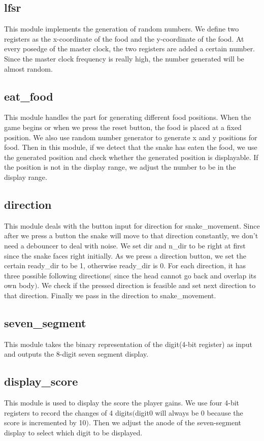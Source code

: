 \documentclass[12pt]{article}
\begin{document}
\subsection*{lfsr}
This module implements the generation of random numbers. We define two registers as the x-coordinate of the food and the y-coordinate of the food. At every posedge of the master clock, the two registers are added a certain number. Since the master clock frequency is really high, the number generated will be almost random.  

\subsection*{eat\_food}
This module handles the part for generating different food positions. When the game begins or when we press the reset button, the food is placed at a fixed position. We also use random number generator to generate x and y positions for food. Then in this module, if we detect that the snake has eaten the food, we use the generated position and check whether the generated position is displayable. If the position is not in the display range, we adjust the number to be in the display range.

\subsection*{direction}
This module deals with the button input for direction for snake\_movement. Since after we press a button the snake will move to that direction constantly, we don't need a debouncer to deal with noise. We set dir and n\_dir to be right at first since the snake faces right initially. As we press a direction button, we set the certain ready\_dir to be 1, otherwise ready\_dir is 0. For each direction, it has three possible following directions$($ since the head cannot go back and overlap its own body$)$. We check if the pressed direction is feasible and set next direction to that direction. Finally we pass in the direction to snake\_movement.

\subsection*{seven\_segment}
This module takes the binary representation of the digit(4-bit register) as input and outputs the 8-digit seven segment display.



\subsection*{display\_score}
This module is used to display the score the player gains. We use four 4-bit registers to record the changes of 4 digits$($digit0 will always be 0 because the score is incremented by 10$)$. Then we adjust the anode of the seven-segment display to select which digit to be displayed. 
\end{document}
